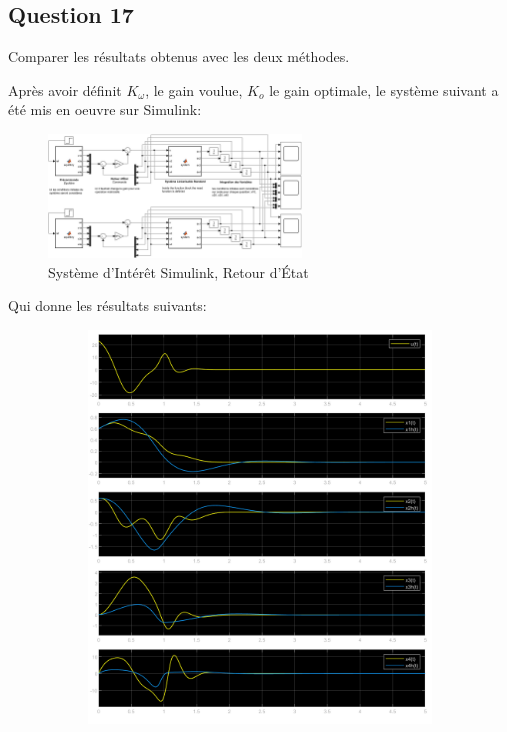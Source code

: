 \documentclass[class=article, crop=false]{standalone}
\begin{document}
\subsection{Question 17}
\begin{exercise}
    Comparer les résultats obtenus avec les deux méthodes.
\end{exercise}
\begin{resolution}
    Après avoir définit $K_{\omega}$, le gain voulue, $K_{o}$ le gain optimale, le système suivant a été mis en oeuvre sur Simulink:
    \begin{figure}[H]
        \centering
        \includegraphics[width=0.6\textwidth]{../images/system_simulink_30.png}
        \caption{Système d'Intérêt Simulink, Retour d'État}
    \end{figure}
    Qui donne les résultats suivants:
    \begin{figure}[H]
        \centering
        \begin{subfigure}[b]{0.45\textwidth}
            \centering
            \includegraphics[width=\textwidth]{../images/m30_r0_s0.6_o0.png}

\end{subfigure}
\end{figure}
\end{resolution}
\end{document}
